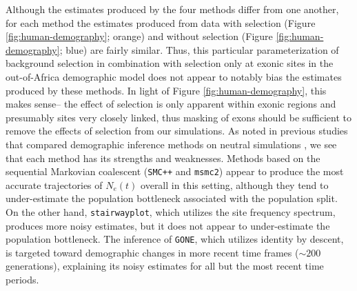 \documentclass[hidelinks]{article}
\newcommand{\msmc}{\texttt{msmc2}\xspace}
\newcommand{\stairway}{\texttt{stairwayplot}\xspace}
\newcommand{\gone}{\texttt{GONE}\xspace}
\newcommand{\smcpp}{\texttt{SMC++}\xspace}
\begin{document}
    Although the estimates produced by the four methods differ from one another, 
    for each method the estimates produced from data with selection (Figure
    \ref{fig:human-demography}; orange) and without selection (Figure
    \ref{fig:human-demography}; blue) are fairly similar.
    Thus, this particular parameterization of background selection
    in combination with selection only at exonic sites in the out-of-Africa demographic model does not
    appear to notably bias the estimates produced by these methods.
    In light of Figure \ref{fig:human-demography}, this makes sense-- 
    the effect of selection is only apparent within exonic regions and presumably sites
    very closely linked, thus masking of exons should be sufficient to remove the effects of selection
    from our simulations. 
    As noted in previous studies that compared demographic inference methods
    on neutral simulations \citep{adrion2020community},
    we see that each method has its strengths and weaknesses.
    Methods based on the sequential Markovian coalescent (\smcpp and \msmc)
    appear to produce the most accurate trajectories of $N_e(t)$ overall
    in this setting, although they tend to under-estimate the population
    bottleneck associated with the population split.
    On the other hand, \stairway, which utilizes the site frequency spectrum,
    produces more noisy estimates,
    but it does not appear to under-estimate the population bottleneck.
    The inference of \gone, which utilizes identity by descent,
    is targeted toward demographic changes in more recent time frames ($\sim 200$ generations),
    explaining its noisy estimates for all but the most recent time periods.
    
    


\end{document}
